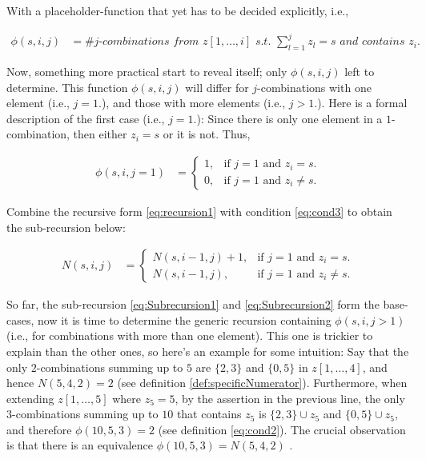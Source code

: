 \documentclass[a4paper,11pt]{article}
\begin{document}
With a placeholder-function that yet has to be decided explicitly, i.e.,

\begin{align}
\label{eq:cond2}
\phi (s,i,j) &= \textit{\# $j$-combinations from $z[1,\ldots,i]$ s.t. $\sum _{l=1}^{j}z_{l}=s$ and contains $z_{i}$.}
\end{align}

Now, something more practical start to reveal itself; only $\phi (s,i,j)$ left to determine. This function $\phi (s,i,j)$ will differ for $j$-combinations with one element (i.e., $j=1$.), and those with more elements (i.e., $j>1$.). Here is a formal description of the first case (i.e., $j=1$.): Since there is only one element in a $1$-combination, then either $z_{i}=s$ or it is not. Thus,

\begin{align}
\label{eq:cond3}
\phi (s,i,j=1) &=\begin{cases}
    1, & \text{if $j=1$ and $z_{i}=s$}.\\
    0, & \text{if $j=1$ and $z_{i}\neq s$}.
  \end{cases}
\end{align}

Combine the recursive form \ref{eq:recursion1} with condition \ref{eq:cond3} to obtain the sub-recursion below:

\begin{align}
\label{eq:Subrecursion2}
N(s,i,j) &=\begin{cases}
    N(s,i-1,j)+1, & \text{if $j=1$ and $z_{i}=s$}.\\
    N(s,i-1,j), & \text{if $j=1$ and $z_{i}\neq s$}.
  \end{cases}
\end{align}

So far, the sub-recursion \ref{eq:Subrecursion1} and \ref{eq:Subrecursion2} form the base-cases, now it is time to determine the generic recursion containing $\phi (s,i,j>1)$ (i.e., for combinations with more than one element). This one is trickier to explain than the other ones, so here's an example for some intuition: Say that the only $2$-combinations summing up to $5$ are $\{2,3\}$ and $\{0,5\}$ in $z[1,\ldots,4]$, and hence $N(5,4,2)=2$ (see definition \ref{def:specificNumerator}). Furthermore, when extending $z[1,\ldots,5]$ where $z_{5}=5$, by the assertion in the previous line, the only $3$-combinations summing up to $10$ that contains $z_{5}$ is $\{2,3\} \cup {z_{5}}$ and $\{0,5\} \cup {z_{5}}$, and therefore $\phi (10,5,3)=2$ (see definition \ref{eq:cond2}). The crucial observation is that there is an equivalence $\phi (10,5,3)=N(5,4,2)$ .
\end{document}
